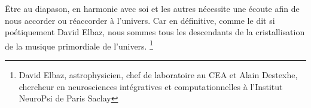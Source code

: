 
 




Être au diapason, en harmonie avec soi et les autres
nécessite une écoute afin de nous accorder ou réaccorder à l'univers.
Car en définitive, comme le dit si poétiquement David Elbaz, nous sommes tous les
descendants de la cristallisation de la musique primordiale de
l'univers. \autocite{delbaz_recherche_2016} \footnote{David Elbaz, astrophysicien, chef de laboratoire au CEA et Alain
Destexhe, chercheur en neurosciences intégratives et computationnelles
à l'Institut  NeuroPsi de Paris Saclay} 


